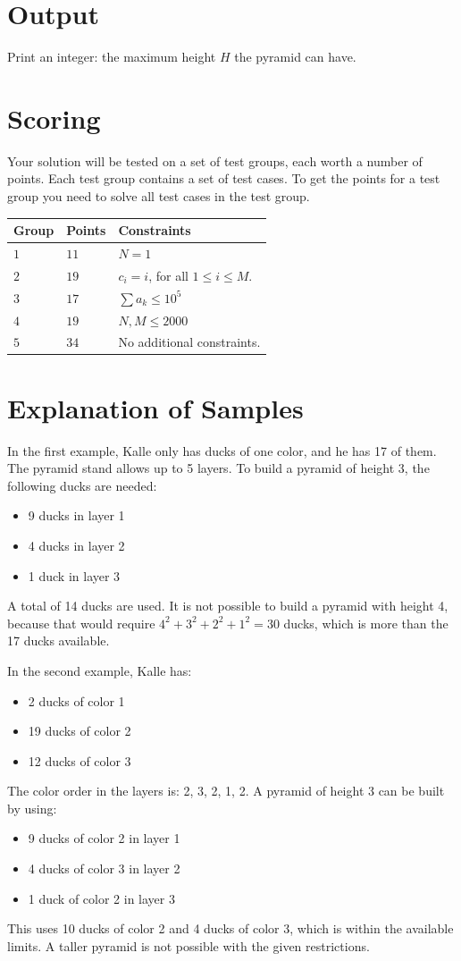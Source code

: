 \section*{Output}
Print an integer: the maximum height $H$ the pyramid can have.

\section*{Scoring}
Your solution will be tested on a set of test groups, each worth a number of points. Each test group contains
a set of test cases. To get the points for a test group you need to solve all test cases in the test group.

\noindent
\begin{tabular}{| l | l | p{12cm} |}
  \hline
  \textbf{Group} & \textbf{Points} & \textbf{Constraints} \\ \hline
  $1$    & $11$       & $N = 1$ \\ \hline
  $2$    & $19$       & $c_i = i$, for all $1 \leq i \leq M$. \\ \hline
  $3$    & $17$       & $\sum a_k \le 10^5$ \\ \hline
  $4$    & $19$       & $N, M \le 2000$ \\ \hline
  $5$    & $34$       & No additional constraints.\\ \hline
\end{tabular}

\section*{Explanation of Samples}
In the first example, Kalle only has ducks of one color, and he has 17 of them. The pyramid stand allows up
to 5 layers. To build a pyramid of height 3, the following ducks are needed:
\begin{itemize}
    \item 9 ducks in layer 1
    \item 4 ducks in layer 2
    \item 1 duck in layer 3
\end{itemize}
A total of 14 ducks are used. It is not possible to build a pyramid with height 4, because that would
require $4^2 + 3^2 + 2^2 + 1^2 = 30$ ducks, which is more than the 17 ducks available.

In the second example, Kalle has:
\begin{itemize}
    \item 2 ducks of color 1
    \item 19 ducks of color 2
    \item 12 ducks of color 3
\end{itemize}
The color order in the layers is: 2, 3, 2, 1, 2. A pyramid of height 3 can be built by using:
\begin{itemize}
    \item 9 ducks of color 2 in layer 1
    \item 4 ducks of color 3 in layer 2
    \item 1 duck of color 2 in layer 3
\end{itemize}
This uses 10 ducks of color 2 and 4 ducks of color 3, which is within the available limits. A taller pyramid
is not possible with the given restrictions.
